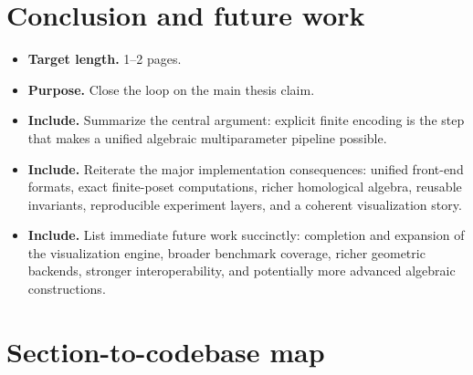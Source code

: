 \documentclass[11pt]{article}
\newenvironment{plan}{\begin{itemize}[leftmargin=1.6em,itemsep=0.35em,topsep=0.25em]}{\end{itemize}}
\newcommand{\target}[1]{\item \textbf{Target length.} #1}
\newcommand{\purpose}[1]{\item \textbf{Purpose.} #1}
\newcommand{\includeitems}[1]{\item \textbf{Include.} #1}
\begin{document}
\section{Conclusion and future work}\label{sec:conclusion}

\begin{plan}
    \target{1--2 pages.}
    \purpose{Close the loop on the main thesis claim.}
    \includeitems{Summarize the central argument: explicit finite encoding is the step that makes a unified algebraic multiparameter pipeline possible.}
    \includeitems{Reiterate the major implementation consequences: unified front-end formats, exact finite-poset computations, richer homological algebra, reusable invariants, reproducible experiment layers, and a coherent visualization story.}
    \includeitems{List immediate future work succinctly: completion and expansion of the visualization engine, broader benchmark coverage, richer geometric backends, stronger interoperability, and potentially more advanced algebraic constructions.}
\end{plan}

\appendix

\section{Section-to-codebase map}\label{app:code-map}
\end{document}
